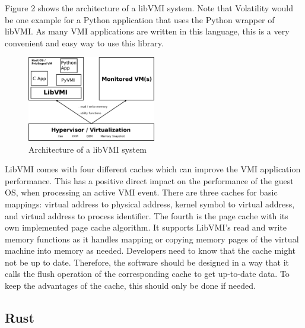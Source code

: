 \documentclass[sigconf]{acmart}
\begin{document}
Figure 2 shows the architecture of a libVMI system. Note that Volatility would be one example for a Python application that uses the Python wrapper of libVMI. As many VMI applications are written in this language, this is a very convenient and easy way to use this library.
\newline
\begin{figure}[h]
\centering
\includegraphics[width=0.5\textwidth]{libvmidiagramm}
\caption{Architecture of a libVMI system}
\end{figure}
\newline
LibVMI comes with four different caches which can improve the VMI application performance. This has a positive direct impact on the performance of the guest OS, when processing an active VMI event. There are three caches for basic mappings: virtual address to physical address, kernel symbol to virtual address, and virtual address to process identifier. The fourth is the page cache with its own implemented page cache algorithm. It supports LibVMI's read and write memory functions as it handles mapping or copying memory pages of the virtual machine into memory as needed.
\newline
\newline
Developers need to know that the cache might not be up to date. Therefore, the software should be designed in a way that it calls the flush operation of the corresponding cache to get up-to-date data. To keep the advantages of the cache, this should only be done if needed.

\subsection{Rust}
\end{document}
